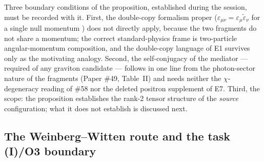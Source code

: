 \documentclass[%
 reprint, amsmath,amssymb, aps, prb, ]{revtex4-2}
\numberwithin{equation}{section}
\begin{document}
Three boundary conditions of the proposition, established during the session, must be recorded with it. First, the double-copy formalism proper ($\varepsilon_{\mu\nu}=\varepsilon_\mu\tilde\varepsilon_\nu$ for a single null momentum \cite{klt,bcj}) does not directly apply, because the two fragments do not share a momentum; the correct standard-physics frame is two-particle angular-momentum composition, and the double-copy language of E1 survives only as the motivating analogy. Second, the self-conjugacy of the mediator --- required of any graviton candidate --- follows in one line from the photon-sector nature of the fragments (Paper \#49, Table~II) and needs neither the $\chi$-degeneracy reading of \#58 nor the deleted positron supplement of E7. Third, the scope: the proposition establishes the rank-2 tensor structure of the \emph{source} configuration; what it does not establish is discussed next.

\subsection{The Weinberg--Witten route and the task (I)/O3 boundary}
\label{sec:ww}
\end{document}
